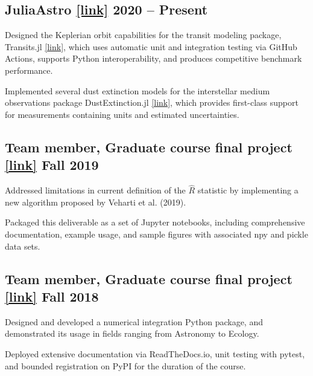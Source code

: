 \subsection[A]{JuliaAstro \href{https://juliaastro.github.io/dev/index.html}{[link]} \hfill 2020 -- Present}
\begin{zitemize}
\item Designed the Keplerian orbit capabilities for the transit modeling package, Transits.jl \href{https://juliaastro.github.io/Transits.jl/dev/}{[link]}, which uses automatic unit and integration testing via GitHub Actions, supports Python interoperability, and produces competitive benchmark performance.
\item Implemented several dust extinction models for the interstellar medium observations package DustExtinction.jl \href{https://juliaastro.github.io/DustExtinction.jl/stable/}{[link]}, which provides first-class support for measurements containing units and estimated uncertainties.
\end{zitemize}

\subsection[B]{Team member, Graduate course final project \href{https://github.com/icweaver/pyhat}{[link]} \hfill Fall 2019}
\begin{zitemize}
\item Addressed limitations in current definition of the $\hat R$ statistic by implementing a new algorithm proposed by Veharti et al. (2019).
\item Packaged this deliverable as a set of Jupyter notebooks, including comprehensive documentation, example usage, and sample figures with associated npy and pickle data sets.
\end{zitemize}

\subsection[C]{Team member, Graduate course final project \href{https://spacejam.readthedocs.io/en/latest/}{[link]} \hfill Fall 2018}
\begin{zitemize}
\item Designed and developed a numerical integration Python package, and demonstrated its usage in fields ranging from Astronomy to Ecology.
\item Deployed extensive documentation via ReadTheDocs.io, unit testing with pytest, and bounded registration on PyPI for the duration of the course.
\end{zitemize}